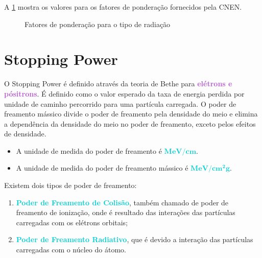 \documentclass[11pt,a4paper]{article}
\newcounter{exemplo}
\begin{document}
		 A \ref{fig:fatorPesoRadiacao} mostra os valores para os fatores de ponderação fornecidos pela CNEN.

		\begin{figure}[h]
			\centering
			\caption{Fatores de ponderação para o tipo de radiação}
			\label{fig:fatorPesoRadiacao}
		\end{figure}


	\section{Stopping Power}

		O Stopping Power é definido através da teoria de Bethe para \textcolor{MediumOrchid}{\textbf{elétrons e pósitrons}}. É definido como o valor esperado da taxa de energia perdida por unidade de caminho percorrido para uma partícula carregada. O poder de freamento mássico divide o poder de freamento pela densidade do meio e elimina a dependência da densidade do meio no poder de freamento, exceto pelos efeitos de densidade. 

			\begin{exemplo}[Unidade]
				\begin{itemize}
					\item A unidade de medida do poder de freamento é \textcolor{DarkTurquoise}{$\mathbf{\unit{MeV/cm}}$}.
					\item A unidade de medida do poder de freamento mássico é \textcolor{DarkTurquoise}{$\mathbf{\unit{MeV/cm^2g}}$}.
				\end{itemize}
			\end{exemplo}

		Existem dois tipos de poder de freamento:

		\begin{enumerate}
			\item \textcolor{DarkTurquoise}{\textbf{Poder de Freamento de Colisão}}, também chamado de poder de freamento de ionização, onde é resultado das interações das partículas carregadas com os elétrons orbitais;
			\item \textcolor{DarkTurquoise}{\textbf{Poder de Freamento Radiativo}}, que é devido a interação das partículas carregadas com o núcleo do átomo.
		\end{enumerate}
\end{document}
